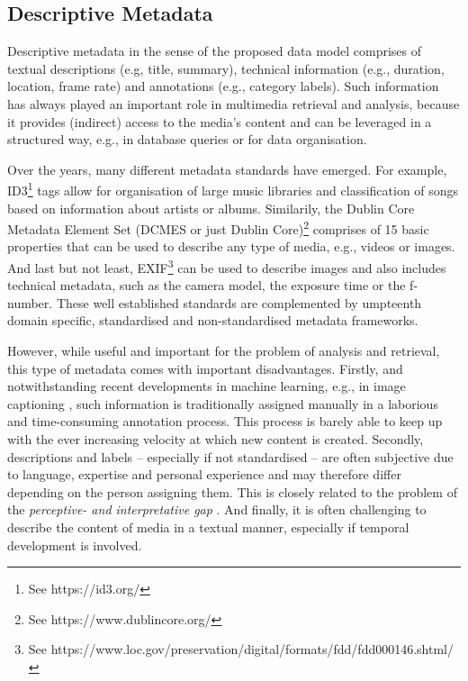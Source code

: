 \subsection{Descriptive Metadata}
Descriptive metadata in the sense of the proposed data model comprises of textual descriptions (e.g, title, summary), technical information (e.g., duration, location, frame rate) and annotations (e.g., category labels). Such information has always played an important role in multimedia retrieval and analysis, because it provides (indirect) access to the media's content and can be leveraged in a structured way, e.g., in database queries or for data organisation.

Over the years, many different metadata standards have emerged. For example, ID3\footnote{See https://id3.org/} tags allow for organisation of large music libraries and classification of songs based on information about artists or albums. Similarily, the Dublin Core Metadata Element Set (DCMES or just Dublin Core)\footnote{See https://www.dublincore.org/} comprises of 15 basic properties that can be used to describe any type of media, e.g., videos or images. And last but not least, EXIF\footnote{See https://www.loc.gov/preservation/digital/formats/fdd/fdd000146.shtml/} can be used to describe images and also includes technical metadata, such as the camera model, the exposure time or the f-number. These well established standards are complemented by umpteenth domain specific, standardised and non-standardised metadata frameworks.

However, while useful and important for the problem of analysis and retrieval, this type of metadata comes with important disadvantages. Firstly, and notwithstanding recent developments in machine learning, e.g., in image captioning \cite{Hossain:2019Comprehensive}, such information is traditionally assigned manually in a laborious and time-consuming annotation process. This process is barely able to keep up with the ever increasing velocity at which new content is created. Secondly, descriptions and labels -- especially if not standardised -- are often subjective due to language, expertise and personal experience and may therefore differ depending on the person assigning them. This is closely related to the problem of the \emph{perceptive- and interpretative gap} \cite{Rossetto:2018thesis}. And finally, it is often challenging to describe the content of media in a textual manner, especially if temporal development is involved.

